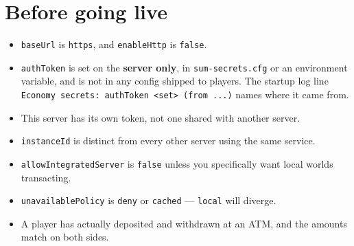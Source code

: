 \documentclass[11pt,a4paper]{article}
\newcommand{\code}[1]{\texttt{\small #1}}
\begin{document}
\section{Before going live}

\begin{itemize}[label=$\square$]
\item \code{baseUrl} is \code{https}, and \code{enableHttp} is \code{false}.
\item \code{authToken} is set on the \textbf{server only}, in \code{sum-secrets.cfg} or an
      environment variable, and is not in any config shipped to players. The startup log line
      \code{Economy secrets: authToken <set> (from ...)} names where it came from.
\item This server has its own token, not one shared with another server.
\item \code{instanceId} is distinct from every other server using the same service.
\item \code{allowIntegratedServer} is \code{false} unless you specifically want local worlds
      transacting.
\item \code{unavailablePolicy} is \code{deny} or \code{cached} --- \code{local} will diverge.
\item A player has actually deposited and withdrawn at an ATM, and the amounts match on both
      sides.
\end{itemize}
\end{document}

